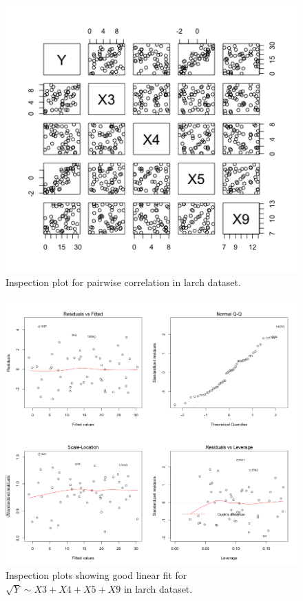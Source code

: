 \documentclass{article}
\begin{document}
\begin{figure}[h!]
  \includegraphics[width=\linewidth]{project/images/06-larch.png}
  \caption{Inspection plot for pairwise correlation in larch dataset.}
  \label{fig:06-larch}
\end{figure}

\begin{figure}[h!]
  \includegraphics[width=\linewidth]{project/images/07-larch.png}
  \caption{Inspection plots showing good linear fit for $\sqrt{Y} \sim X3+X4+X5+X9$ in larch dataset.}
  \label{fig:07-larch}
\end{figure}
\end{document}
